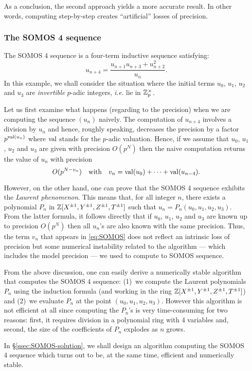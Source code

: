 \documentclass{amsart}
\begin{document}
As a conclusion, the second approach yields a more accurate result.
In other words, computing step-by-step creates ``artificial'' losses 
of precision.

\subsubsection*{The SOMOS 4 sequence}

The SOMOS 4 sequence is a four-term inductive sequence satisfying:
$$u_{n+4} = \frac{u_{n+1} u_{n+3} + u_{n+2}^2}{u_n}.$$
In this example, we shall consider the situation where the initial
terms $u_0$, $u_1$, $u_2$ and $u_3$ are \emph{invertible} $p$-adic 
integers, \emph{i.e.} lie in $\mathbb Z_p^\times$.

Let us first examine what happens (regarding to the precision) when
we are computing the sequence $(u_n)$ naively. The computation of
$u_{n+4}$ involves a division by $u_n$ and hence, roughly speaking,
decreases the precision by a factor $p^{\text{\rm val}(u_n)}$ where $\text{\rm val}$
stands for the $p$-adic valuation. Hence, if we assume that $u_0$,
$u_1$, $u_2$ and $u_3$ are given with precision $O(p^N)$ then the
naive computation returns the value of $u_n$ with precision
\begin{equation}
\label{eq:SOMOS}
O(p^{N-v_n})
\quad \text{with}\quad
v_n = \text{\rm val}(u_0) + \cdots + \text{\rm val}(u_{n-4}).
\end{equation}

However, on the other hand, one can prove that the SOMOS 4 sequence 
exhibits the \emph{Laurent phenomenon}. This means that, for all integer 
$n$, there exists a polynomial $P_n$ in $\mathbb Z[X^{\pm 1}, Y^{\pm 1}, Z^{\pm 
1}, T^{\pm 1}]$ such that $u_n = P_n(u_0, u_1, u_2, u_3)$.
From the latter formula, it follows directly that if $u_0$, $u_1$,
$u_2$ and $u_3$ are known up to precision $O(p^N)$ then all $u_n$'s
are also known with the same precision. Thus, the term $v_n$ that 
appears in \eqref{eq:SOMOS} does not reflect an intrinsic loss of
precision but some numerical instability related to the algorithm ---
which includes the model precision --- we used to compute to SOMOS 
sequence.

\begin{rmk}
From the above discussion, one can easily derive a numerically stable 
algorithm that computes the SOMOS 4 sequence: (1)~we compute the 
Laurent polynomials $P_n$ using the induction formula (and working in 
the ring $\mathbb Z[X^{\pm 1}, Y^{\pm 1}, Z^{\pm 1}, T^{\pm 1}]$) and (2)~we 
evaluate $P_n$ at the point $(u_0, u_1, u_2, u_3)$.
However this algorithm is not efficient at all since computing the 
$P_n$'s is very time-consuming for two reasons: first, it requires 
division in a polynomial ring with $4$ variables and, second, the
size of the coefficients of $P_n$ explodes as $n$ grows.

In \S \ref{ssec:SOMOS-solution}, we shall design an algorithm computing 
the SOMOS 4 sequence which turns out to be, at the same time, efficient 
and numerically stable.
\end{rmk}
\end{document}
